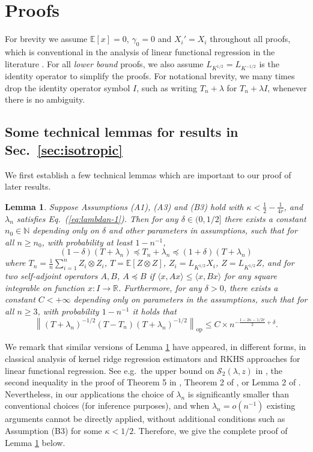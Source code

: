 \documentclass[11pt,a4paper]{article}
\theoremstyle{definition}
\theoremstyle{plain}
\newtheorem{lemma}{Lemma}[section]
\theoremstyle{remark}
\newcommand{\op}{\mathrm{op}}
\begin{document}
\clearpage
\section{Proofs}

For brevity we assume $\mathbb E[x]=0$, $\gamma_0=0$ and $X_i'=X_i$ throughout all proofs, which is conventional in the analysis of linear functional regression in the literature \citep{cai2012minimax,yuan2010reproducing}.
For all \emph{lower bound} proofs, we also assume $L_{K^{1/2}}=L_{K^{-1/2}}$ is the identity operator to simplify the proofs.
For notational brevity, we many times drop the identity operator symbol $I$, such as writing $T_n+\lambda$ for $T_n+\lambda I$, whenever there is no ambiguity.



\subsection{Some technical lemmas for results in Sec.~\ref{sec:isotropic}}

We first establish a few technical lemmas which are important to our proof of later results.
\begin{lemma}
Suppose Assumptions (A1), (A3) and (B3) hold with $\kappa<\frac{1}{2}-\frac{1}{4r}$, and $\lambda_n$ satisfies Eq.~(\ref{eq:lambdan-1}). Then for any $\delta\in(0,1/2]$ there exists a constant $n_0\in\mathbb N$ depending only on $\delta$ and other parameters in assumptions,
 such that for all $n\geq n_0$, with probability at least $1-n^{-1}$,
$$
(1-\delta)(T+\lambda_n)\preceq T_n+\lambda_n \preceq (1+\delta)(T+\lambda_n)
$$
where $T_n=\frac{1}{n}\sum_{i=1}^n Z_i\otimes Z_i$, $T=\mathbb E[Z\otimes Z]$, $Z_i=L_{K^{1/2}}X_i$, $Z=L_{K^{1/2}}Z$, and for two self-adjoint operators $A,B$, $A\preceq B$ if $\langle x,Ax\rangle\leq \langle x, Bx\rangle$
for any square integrable on function $x:I\to\mathbb R$.
Furthermore, for any $\delta>0$, there exists a constant $C<+\infty$ depending only on parameters in the assumptions, such that for all $n\geq 3$, with probability $1-n^{-1}$ it holds that
$$
\left\|(T+\lambda_n)^{-1/2}(T-T_n)(T+\lambda_n)^{-1/2}\right\|_\op \leq C\times n^{-\frac{1-2\kappa-1/2r}{2}+\delta}.
$$
\label{lem:empirical-population-cov}
\end{lemma}

We remark that similar versions of Lemma \ref{lem:empirical-population-cov} have appeared, in different forms, in classical analysis of kernel ridge regression estimators and RKHS approaches for linear functional regression.
See e.g.~the upper bound on $\mathcal S_2(\lambda,z)$ in \citep{caponnetto2007optimal}, the second inequality in the proof of Theorem 5 in \citep{smale2007learning}, 
Theorem 2 of \citep{hsu2014random},
or Lemma 2 of \citep{cai2012minimax}.
Nevertheless, in our applications the choice of $\lambda_n$ is significantly smaller than conventional choices (for inference purposes), and when $\lambda_n = o(n^{-1})$ existing arguments cannot be directly applied,
without additional conditions such as Assumption (B3) for some $\kappa<1/2$. Therefore, we give the complete proof of Lemma \ref{lem:empirical-population-cov} below.
\end{document}
